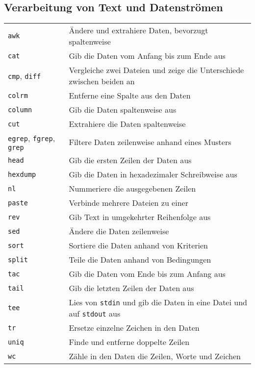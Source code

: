 \documentclass[10pt,a4paper]{article}
\begin{document}
\begin{multicols}{2}
\section{Verarbeitung von Text und Datenströmen}
\begin{tabular}{ p{2.5cm} p{8.5cm} }
  \hline
  \texttt{awk} & Ändere und extrahiere Daten, bevorzugt spaltenweise \\
  \texttt{cat} & Gib die Daten vom Anfang bis zum Ende aus\\
  \texttt{cmp}, \texttt{diff} & Vergleiche zwei Dateien und zeige die Unterschiede zwischen beiden an\\
  \texttt{colrm} & Entferne eine Spalte aus den Daten \\
  \texttt{column} & Gib die Daten spaltenweise aus \\
  \texttt{cut} &  Extrahiere die Daten spaltenweise\\
  \texttt{egrep}, \texttt{fgrep}, \texttt{grep} & Filtere Daten zeilenweise anhand eines Musters\\
  \texttt{head} & Gib die ersten Zeilen der Daten aus\\
  \texttt{hexdump} & Gib die Daten in hexadezimaler Schreibweise aus\\
  \texttt{nl} & Nummeriere die ausgegebenen Zeilen \\
  \texttt{paste} & Verbinde mehrere Dateien zu einer \\
  \texttt{rev} & Gib Text in umgekehrter Reihenfolge aus \\
  \texttt{sed} & Ändere die Daten zeilenweise \\
  \texttt{sort} & Sortiere die Daten anhand von Kriterien\\
  \texttt{split} & Teile die Daten anhand von Bedingungen \\
  \texttt{tac} & Gib die Daten vom Ende bis zum Anfang aus\\
  \texttt{tail} & Gib die letzten Zeilen der Daten aus\\
  \texttt{tee} & Lies von \texttt{stdin} und gib die Daten in eine Datei und auf \texttt{stdout} aus\\
  \texttt{tr} & Ersetze einzelne Zeichen in den Daten\\
  \texttt{uniq} & Finde und entferne doppelte Zeilen \\
  \texttt{wc} & Zähle in den Daten die Zeilen, Worte und Zeichen\\
  \hline
\end{tabular}


\end{multicols}
\end{document}
